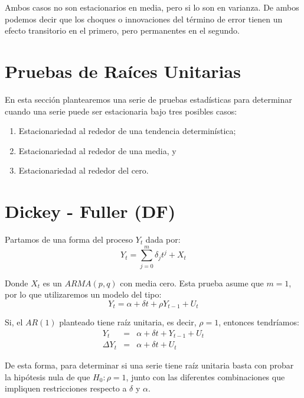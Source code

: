 \documentclass[
]{book}
\begin{document}
Ambos casos no son estacionarios en media, pero si lo son en varianza. De ambos podemos decir que los choques o innovaciones del término de error tienen un efecto transitorio en el primero, pero permanentes en el segundo.

\hypertarget{pruebas-de-rauxedces-unitarias}{%
\section{Pruebas de Raíces Unitarias}\label{pruebas-de-rauxedces-unitarias}}

En esta sección plantearemos una serie de pruebas estadísticas para determinar cuando una serie puede ser estacionaria bajo tres posibles casos:

\begin{enumerate}
\def\labelenumi{\arabic{enumi}.}
\item
  Estacionariedad al rededor de una tendencia determinística;
\item
  Estacionariedad al rededor de una media, y
\item
  Estacionariedad al rededor del cero.
\end{enumerate}

\hypertarget{dickey---fuller-df}{%
\section{Dickey - Fuller (DF)}\label{dickey---fuller-df}}

Partamos de una forma del proceso \(Y_t\) dada por:
\begin{equation}
    Y_t = \sum_{j = 0}^m \delta_j t^j + X_t
    \label{eq:URDFG}
\end{equation}

Donde \(X_t\) es un \(ARMA(p, q)\) con media cero. Esta prueba asume que \(m = 1\), por lo que utilizaremos un modelo del tipo:
\begin{equation}
    Y_t = \alpha + \delta t + \rho Y_{t-1} + U_t
    \label{eq:URDF}
\end{equation}

Si, el \(AR(1)\) planteado tiene raíz unitaria, es decir, \(\rho = 1\), entonces tendríamos:
\begin{eqnarray*}
    Y_t & = & \alpha + \delta t + Y_{t-1} + U_t \\
    \Delta Y_t & = & \alpha + \delta t + U_t
\end{eqnarray*}

De esta forma, para determinar si una serie tiene raíz unitaria basta con probar la hipótesis nula de que \(H_0 : \rho = 1\), junto con las diferentes combinaciones que impliquen restricciones respecto a \(\delta\) y \(\alpha\).
\end{document}
